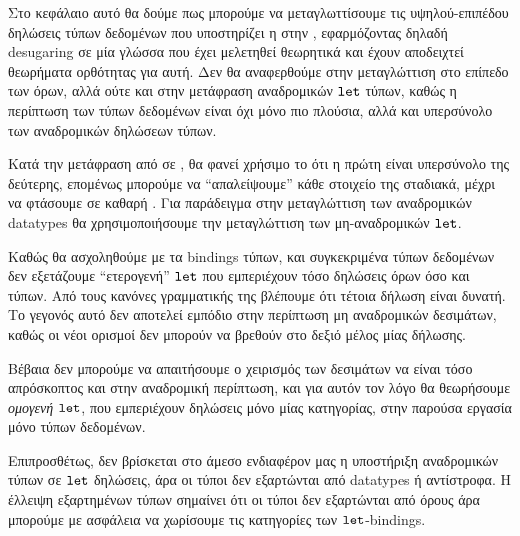 Στο κεφάλαιο αυτό θα δούμε πως μπορούμε να μεταγλωττίσουμε τις υψηλού-επιπέδου
δηλώσεις τύπων δεδομένων που υποστηρίζει η \FIR{} στην \FOMF, εφαρμόζοντας
δηλαδή desugaring σε μία γλώσσα που έχει μελετηθεί θεωρητικά και έχουν
αποδειχτεί θεωρήματα ορθότητας για αυτή. Δεν θα αναφερθούμε στην μεταγλώττιση
στο επίπεδο των όρων, αλλά ούτε και στην μετάφραση αναδρομικών $\operatorname{\texttt{let}}$ τύπων,
καθώς η περίπτωση των τύπων δεδομένων είναι όχι μόνο πιο πλούσια, αλλά και
υπερσύνολο των αναδρομικών δηλώσεων τύπων.

Κατά την μετάφραση από \FIR{} σε \FOMF{}, θα φανεί χρήσιμο το ότι η πρώτη είναι
υπερσύνολο της δεύτερης, επομένως μπορούμε να ``απαλείψουμε'' κάθε στοιχείο της
\FIR{} σταδιακά, μέχρι να φτάσουμε σε καθαρή \FOMF{}. Για παράδειγμα στην
μεταγλώττιση των αναδρομικών datatypes θα χρησιμοποιήσουμε την μεταγλώττιση των
μη-αναδρομικών $\operatorname{\texttt{let}}$.

Καθώς θα ασχοληθούμε με τα bindings τύπων, και συγκεκριμένα τύπων δεδομένων δεν
εξετάζουμε ``ετερογενή'' $\operatorname{\texttt{let}}$ που εμπεριέχουν τόσο δηλώσεις όρων όσο και
τύπων. Από τους κανόνες γραμματικής της \FIR{} βλέπουμε ότι τέτοια δήλωση είναι
δυνατή. Το γεγονός αυτό δεν αποτελεί εμπόδιο στην περίπτωση μη αναδρομικών
δεσιμάτων, καθώς οι νέοι ορισμοί δεν μπορούν να βρεθούν στο δεξιό μέλος μίας
δήλωσης.

Βέβαια δεν μπορούμε να απαιτήσουμε ο χειρισμός των δεσιμάτων να είναι τόσο
απρόσκοπτος και στην αναδρομική περίπτωση, και για αυτόν τον λόγο θα θεωρήσουμε
\emph{ομογενή} $\operatorname{\texttt{let}}$, που εμπεριέχουν δηλώσεις μόνο μίας κατηγορίας, στην
παρούσα εργασία μόνο τύπων δεδομένων.

Επιπροσθέτως, δεν βρίσκεται στο άμεσο ενδιαφέρον μας η υποστήριξη αναδρομικών
τύπων σε $\operatorname{\texttt{let}}$ δηλώσεις, άρα οι τύποι δεν εξαρτώνται από datatypes ή
αντίστροφα. Η έλλειψη εξαρτημένων τύπων σημαίνει ότι οι τύποι δεν εξαρτώνται
από όρους άρα μπορούμε με ασφάλεια να χωρίσουμε τις κατηγορίες των
$\operatorname{\texttt{let}}$-bindings.

